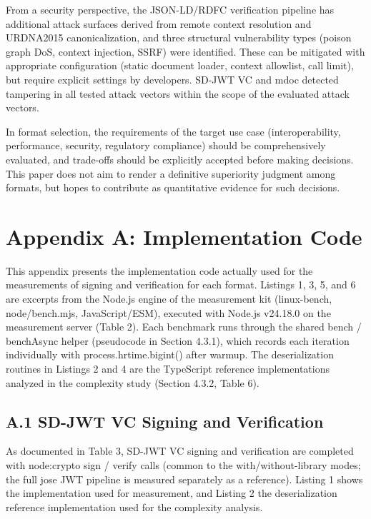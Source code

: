 \documentclass[conference]{IEEEtran}
\begin{document}
From a security perspective, the JSON-LD/RDFC verification pipeline has additional attack surfaces derived from remote context resolution and URDNA2015 canonicalization, and three structural vulnerability types (poison graph DoS, context injection, SSRF) were identified. These can be mitigated with appropriate configuration (static document loader, context allowlist, call limit), but require explicit settings by developers. SD-JWT VC and mdoc detected tampering in all tested attack vectors within the scope of the evaluated attack vectors.

In format selection, the requirements of the target use case (interoperability, performance, security, regulatory compliance) should be comprehensively evaluated, and trade-offs should be explicitly accepted before making decisions. This paper does not aim to render a definitive superiority judgment among formats, but hopes to contribute as quantitative evidence for such decisions.

\section*{Appendix A: Implementation Code}

This appendix presents the implementation code actually used for the measurements of signing and verification for each format. Listings 1, 3, 5, and 6 are excerpts from the Node.js engine of the measurement kit (linux-bench, node/bench.mjs, JavaScript/ESM), executed with Node.js v24.18.0 on the measurement server (Table 2). Each benchmark runs through the shared bench / benchAsync helper (pseudocode in Section 4.3.1), which records each iteration individually with process.hrtime.bigint() after warmup. The deserialization routines in Listings 2 and 4 are the TypeScript reference implementations analyzed in the complexity study (Section 4.3.2, Table 6).

\subsection*{A.1 SD-JWT VC Signing and Verification}

As documented in Table 3, SD-JWT VC signing and verification are completed with node:crypto sign / verify calls (common to the with/without-library modes; the full jose JWT pipeline is measured separately as a reference). Listing 1 shows the implementation used for measurement, and Listing 2 the deserialization reference implementation used for the complexity analysis.
\end{document}
